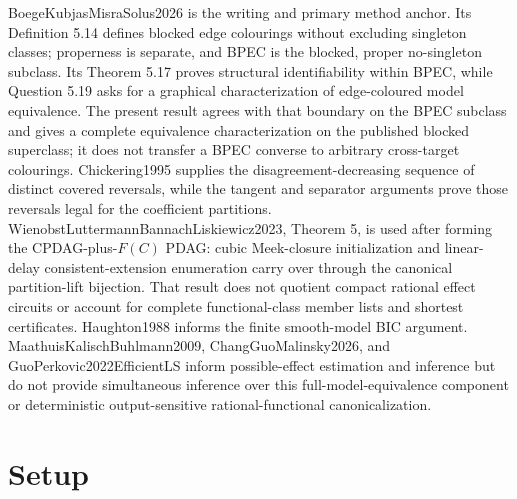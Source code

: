 \documentclass{article}
\begin{document}
BoegeKubjasMisraSolus2026 is the writing and primary method anchor. Its Definition 5.14 defines blocked edge colourings without excluding singleton classes; properness is separate, and BPEC is the blocked, proper no-singleton subclass. Its Theorem 5.17 proves structural identifiability within BPEC, while Question 5.19 asks for a graphical characterization of edge-coloured model equivalence. The present result agrees with that boundary on the BPEC subclass and gives a complete equivalence characterization on the published blocked superclass; it does not transfer a BPEC converse to arbitrary cross-target colourings. Chickering1995 supplies the disagreement-decreasing sequence of distinct covered reversals, while the tangent and separator arguments prove those reversals legal for the coefficient partitions. WienobstLuttermannBannachLiskiewicz2023, Theorem 5, is used after forming the CPDAG-plus-\(F(C)\) PDAG: cubic Meek-closure initialization and linear-delay consistent-extension enumeration carry over through the canonical partition-lift bijection. That result does not quotient compact rational effect circuits or account for complete functional-class member lists and shortest certificates. Haughton1988 informs the finite smooth-model BIC argument. MaathuisKalischBuhlmann2009, ChangGuoMalinsky2026, and GuoPerkovic2022EfficientLS inform possible-effect estimation and inference but do not provide simultaneous inference over this full-model-equivalence component or deterministic output-sensitive rational-functional canonicalization.

\section{Setup}
\end{document}
